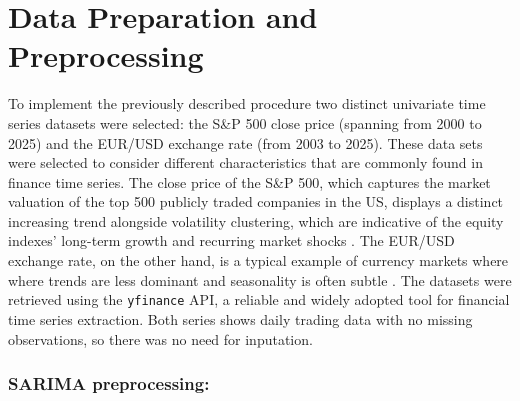 \section{Data Preparation and Preprocessing} 
To implement the previously described procedure two distinct univariate time series datasets were selected: the S\&P 500 close price (spanning from 2000 to 2025) and the EUR/USD exchange rate (from 2003 to 2025). These data sets were selected to consider different characteristics that are commonly found in finance time series. The close price of the S\&P 500, which captures the market valuation of the top 500 publicly traded companies in the US, displays a distinct increasing trend alongside volatility clustering, which are indicative of the equity indexes' long-term growth and recurring market shocks \cite{Cont2001}. The EUR/USD exchange rate, on the other hand, is a typical example of currency markets where where trends are less dominant and seasonality is often subtle \cite{Cellini2011}. The datasets were retrieved using the \texttt{yfinance} API,  a reliable and widely adopted tool for financial time series extraction. Both series shows daily trading data with no missing observations, so there was no need for inputation.

\subsubsection{SARIMA preprocessing:}

